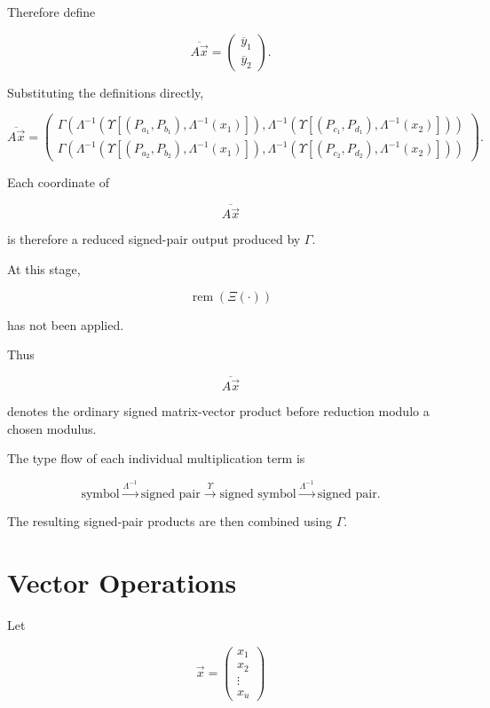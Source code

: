 \documentclass[12pt]{article}
\begin{document}
Therefore define

\[
\boxed{
\overline{A\vec{x}}
=
\begin{pmatrix}
\overline{y}_1\\
\overline{y}_2
\end{pmatrix}.
}
\]

Substituting the definitions directly,

\[
\boxed{
\overline{A\vec{x}}
=
\begin{pmatrix}
\Gamma
\left(
\Lambda^{-1}
\left(
\Upsilon
\left[
(P_{a_1},P_{b_1}),
\Lambda^{-1}(x_1)
\right]
\right),
\Lambda^{-1}
\left(
\Upsilon
\left[
(P_{c_1},P_{d_1}),
\Lambda^{-1}(x_2)
\right]
\right)
\right)
\\[18pt]
\Gamma
\left(
\Lambda^{-1}
\left(
\Upsilon
\left[
(P_{a_2},P_{b_2}),
\Lambda^{-1}(x_1)
\right]
\right),
\Lambda^{-1}
\left(
\Upsilon
\left[
(P_{c_2},P_{d_2}),
\Lambda^{-1}(x_2)
\right]
\right)
\right)
\end{pmatrix}.
}
\]

Each coordinate of

\[
\overline{A\vec{x}}
\]

is therefore a reduced signed-pair output produced by \(\Gamma\).

At this stage,

\[
\operatorname{rem}(\Xi(\cdot))
\]

has not been applied.

Thus

\[
\overline{A\vec{x}}
\]

denotes the ordinary signed matrix-vector product before reduction modulo a chosen modulus.

The type flow of each individual multiplication term is

\[
\boxed{
\text{symbol}
\overset{\Lambda^{-1}}{\longrightarrow}
\text{signed pair}
\overset{\Upsilon}{\longrightarrow}
\text{signed symbol}
\overset{\Lambda^{-1}}{\longrightarrow}
\text{signed pair}.
}
\]

The resulting signed-pair products are then combined using \(\Gamma\).

\section*{Vector Operations}

Let

\[
\vec{x}
=
\begin{pmatrix}
x_1\\
x_2\\
\vdots\\
x_u
\end{pmatrix}
\]
\end{document}
